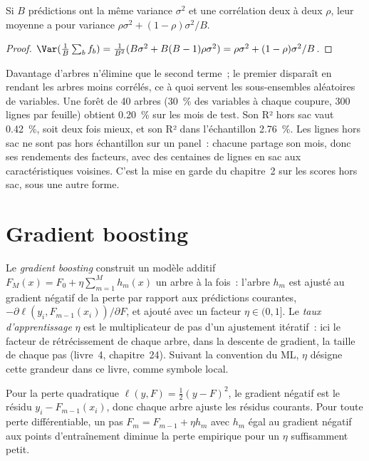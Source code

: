 \begin{proposition}\label{prop:ml:trees:bagging}
Si $B$ prédictions ont la même variance $\sigma^2$ et une corrélation deux à deux $\rho$, leur moyenne a pour variance
$\rho\sigma^2 + (1 - \rho)\sigma^2/B$.
\end{proposition}

\begin{proof}
$\Var(\frac1B\sum_bf_b) = \frac1{B^2}(B\sigma^2 + B(B-1)\rho\sigma^2) = \rho\sigma^2 + (1-\rho)\sigma^2/B$.
\end{proof}

Davantage d'arbres n'élimine que le second terme~; le premier disparaît en rendant les arbres moins corrélés, ce à quoi servent les
sous-ensembles aléatoires de variables. Une forêt de 40 arbres (30~\% des variables à chaque coupure, 300 lignes par feuille) obtient 0.20~\%
sur les mois de test. Son R² hors sac vaut 0.42~\%, soit deux fois mieux, et son R² dans l'échantillon 2.76~\%. Les
lignes hors sac ne sont pas hors échantillon sur un panel~: chacune partage son mois, donc ses rendements des facteurs, avec des centaines de lignes en sac
aux caractéristiques voisines. C'est la mise en garde du chapitre~2 sur les scores hors sac, sous une autre forme.

\section{Gradient boosting}

\begin{definition}\label{def:ml:trees-and-boosting:boosting}
Le \emph{gradient boosting} construit un modèle additif $F_M(x) = F_0 + \eta\sum_{m=1}^Mh_m(x)$ un
arbre à la fois~: l'arbre $h_m$ est ajusté au gradient négatif de la perte par rapport aux prédictions courantes,
$-\partial\ell(y_i, F_{m-1}(x_i))/\partial F$, et ajouté avec un facteur $\eta\in(0,1]$. Le \emph{taux
d'apprentissage} $\eta$ est le multiplicateur de pas d'un ajustement itératif~: ici le facteur de rétrécissement de chaque arbre, dans
la descente de gradient, la taille de chaque pas (livre~4, chapitre~24). Suivant la convention du ML, $\eta$ désigne
cette grandeur dans ce livre, comme symbole local.
\end{definition}

\begin{proposition}\label{prop:ml:trees:gradient}
Pour la perte quadratique $\ell(y, F) = \frac12(y - F)^2$, le gradient négatif est le résidu $y_i - F_{m-1}(x_i)$, donc chaque
arbre ajuste les résidus courants. Pour toute perte différentiable, un pas $F_m = F_{m-1} + \eta h_m$ avec $h_m$ égal au
gradient négatif aux points d'entraînement diminue la perte empirique pour un $\eta$ suffisamment petit.
\end{proposition}

